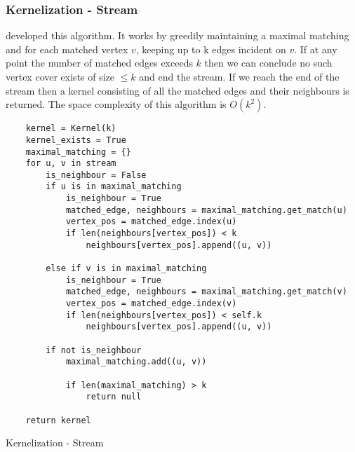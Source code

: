 \subsubsection{Kernelization - Stream}

\cite{chitnis2015parameterized} developed this algorithm. It works by greedily
maintaining a maximal matching and for each matched vertex \(v\), keeping up to
k edges incident on \(v\). If at any point the number of matched edges exceeds
\(k\) then we can conclude no such vertex cover exists of size \(\leq k\) and
end the stream. If we reach the end of the stream then a kernel consisting of
all the matched edges and their neighbours is returned. The space complexity of
this algorithm is \(O(k^2)\).

\begin{verbatim}
    kernel = Kernel(k)
    kernel_exists = True
    maximal_matching = {}
    for u, v in stream
        is_neighbour = False
        if u is in maximal_matching
            is_neighbour = True
            matched_edge, neighbours = maximal_matching.get_match(u)
            vertex_pos = matched_edge.index(u)
            if len(neighbours[vertex_pos]) < k
                neighbours[vertex_pos].append((u, v))

        else if v is in maximal_matching
            is_neighbour = True
            matched_edge, neighbours = maximal_matching.get_match(v)
            vertex_pos = matched_edge.index(v)
            if len(neighbours[vertex_pos]) < self.k
                neighbours[vertex_pos].append((u, v))

        if not is_neighbour
            maximal_matching.add((u, v))

            if len(maximal_matching) > k
                return null

    return kernel
\end{verbatim}

\begin{algorithm}[H]
    \caption{Kernelization - Stream}
    \DontPrintSemicolon

\end{algorithm}


